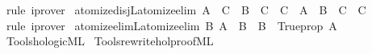 \begin{isabellebody}
\endisadelimproof
%
\isatagproof
{}\isamarkupfalse%
\ rule\ iprover{\isacharplus}{\kern0pt}%
\endisatagproof
{\isafoldproof}%
%
\isadelimproof
\isanewline
%
\endisadelimproof
\isanewline
{}\isamarkupfalse%
\ atomize{\isacharunderscore}{\kern0pt}disjL{\isacharbrackleft}{\kern0pt}atomize{\isacharunderscore}{\kern0pt}elim{\isacharbrackright}{\kern0pt}{\isacharcolon}{\kern0pt}\ {\isachardoublequoteopen}{\isacharparenleft}{\kern0pt}{\isacharparenleft}{\kern0pt}A\ {\isasymLongrightarrow}\ C{\isacharparenright}{\kern0pt}\ {\isasymLongrightarrow}\ {\isacharparenleft}{\kern0pt}B\ {\isasymLongrightarrow}\ C{\isacharparenright}{\kern0pt}\ {\isasymLongrightarrow}\ C{\isacharparenright}{\kern0pt}\ {\isasymequiv}\ {\isacharparenleft}{\kern0pt}{\isacharparenleft}{\kern0pt}A\ {\isasymor}\ B\ {\isasymLongrightarrow}\ C{\isacharparenright}{\kern0pt}\ {\isasymLongrightarrow}\ C{\isacharparenright}{\kern0pt}{\isachardoublequoteclose}\isanewline
%
\isadelimproof
\ \ %
\endisadelimproof
%
\isatagproof
{}\isamarkupfalse%
\ rule\ iprover{\isacharplus}{\kern0pt}%
\endisatagproof
{\isafoldproof}%
%
\isadelimproof
\isanewline
%
\endisadelimproof
\isanewline
{}\isamarkupfalse%
\ atomize{\isacharunderscore}{\kern0pt}elimL{\isacharbrackleft}{\kern0pt}atomize{\isacharunderscore}{\kern0pt}elim{\isacharbrackright}{\kern0pt}{\isacharcolon}{\kern0pt}\ {\isachardoublequoteopen}{\isacharparenleft}{\kern0pt}{\isasymAnd}B{\isachardot}{\kern0pt}\ {\isacharparenleft}{\kern0pt}A\ {\isasymLongrightarrow}\ B{\isacharparenright}{\kern0pt}\ {\isasymLongrightarrow}\ B{\isacharparenright}{\kern0pt}\ {\isasymequiv}\ Trueprop\ A{\isachardoublequoteclose}%
\isadelimproof
\ %
\endisadelimproof
%
\isatagproof
\isacommand{{\isachardot}{\kern0pt}{\isachardot}{\kern0pt}}\isamarkupfalse%
%
\endisatagproof
{\isafoldproof}%
%
\isadelimproof
%
\endisadelimproof
%
\isadelimdocument
%
\endisadelimdocument
%
\isatagdocument
%
\isamarkuptrue%
%
\endisatagdocument
{\isafolddocument}%
%
\isadelimdocument
%
\endisadelimdocument
%
\isadelimML
%
\endisadelimML
%
\isatagML
{}\isamarkupfalse%
\ {\isacartoucheopen}Tools{\isacharslash}{\kern0pt}hologic{\isachardot}{\kern0pt}ML{\isacartoucheclose}\isanewline
{}\isamarkupfalse%
\ {\isacartoucheopen}Tools{\isacharslash}{\kern0pt}rewrite{\isacharunderscore}{\kern0pt}hol{\isacharunderscore}{\kern0pt}proof{\isachardot}{\kern0pt}ML{\isacartoucheclose}\isanewline
\isanewline
{}\isamarkupfalse%

\end{isabellebody}
